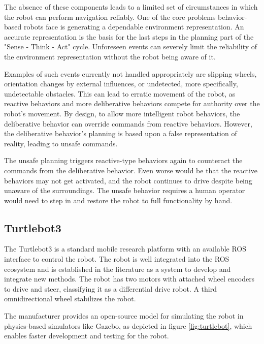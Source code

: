 The absence of these components leads to a limited set of circumstances in which the robot can perform navigation reliably. One of the core problems behavior-based robots face is generating a dependable environment representation. An accurate representation is the basis for the last steps in the planning part of the "Sense - Think - Act" cycle. Unforeseen events can severely limit the reliability of the environment representation without the robot being aware of it. 

Examples of such events currently not handled appropriately are slipping wheels, orientation changes by external influences, or undetected, more specifically, undetectable obstacles. This can lead to erratic movement of the robot, as reactive behaviors and more deliberative behaviors compete for authority over the robot's movement. By design, to allow more intelligent robot behaviors, the deliberative behavior can override commands from reactive behaviors. However, the deliberative behavior's planning is based upon a false representation of reality, leading to unsafe commands. 

The unsafe planning triggers reactive-type behaviors again to counteract the commands from the deliberative behavior. Even worse would be that the reactive behaviors may not get activated, and the robot continues to drive despite being unaware of the surroundings. The unsafe behavior requires a human operator would need to step in and restore the robot to full functionality by hand. 


\subsection{Turtlebot3}
\label{subsec:Turtlebot3}

The Turtlebot3 is a standard mobile research platform with an available ROS interface to control the robot. The robot is well integrated into the ROS ecosystem and is established in the literature as a system to develop and integrate new methods. The robot has two motors with attached wheel encoders to drive and steer, classifying it as a differential drive robot. A third omnidirectional wheel stabilizes the robot. 

The manufacturer provides an open-source model for simulating the robot in physics-based simulators like Gazebo, as depicted in figure \ref{fig:turtlebot}, which enables faster development and testing for the robot.

